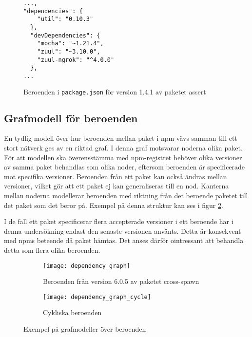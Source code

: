 \lstset{language=Java}
\begin{figure}[h]
  \center
  \begin{minipage}[c]{5cm}
    \begin{lstlisting}
...,
"dependencies": {
    "util": "0.10.3"
  },
  "devDependencies": {
    "mocha": "~1.21.4",
    "zuul": "~3.10.0",
    "zuul-ngrok": "^4.0.0"
  },
...
    \end{lstlisting}
  \end{minipage}
  \caption[Beroenden i \texttt{package.json} för version 1.4.1 av paketet assert]{Beroenden i \texttt{package.json} för version 1.4.1 av paketet assert \cite{npm-assert}}
  \label{fig:package.json}
\end{figure}

\subsection{Grafmodell för beroenden}
\label{subsec:joel_o-grafmodell}
En tydlig modell över hur beroenden mellan paket i npm vävs samman till ett stort nätverk ges av en riktad graf. I denna graf motsvarar noderna olika paket. För att modellen ska överensstämma med npm-registret behöver olika versioner av samma paket behandlas som olika noder, eftersom beroenden är specificerade mot specifika versioner. Beroenden från ett paket kan också ändras mellan versioner, vilket gör att ett paket ej kan generaliseras till en nod. Kanterna mellan noderna modellerar beroenden med riktning från det beroende paketet till det paket som det beror på. Exempel på denna struktur kan ses i figur \ref{fig:beroende-graf}.

I de fall ett paket specificerar flera accepterade versioner i ett beroende har i denna undersökning endast den senaste versionen använts. Detta är konsekvent med npms beteende då paket hämtas. Det anses därför ointressant att behandla detta som flera olika beroenden.

\begin{figure}
  \captionsetup{justification=centering}
  \centering
  \begin{subfigure}[t]{.5\textwidth}
    \begin{minipage}[t][8cm][b]{0,5\textwidth}
      \vspace*{\fill}
        \texttt{[image: dependency\_graph]}
      \vspace*{\fill}
    \end{minipage}
    \caption{Beroenden från version 6.0.5 av paketet cross-spawn}
    \label{fig:beroende-graf}
  \end{subfigure}%
  \begin{subfigure}[t]{.5\textwidth}
    \begin{minipage}[t][8cm][b]{0,5\textwidth}
      \vspace*{\fill}
      \texttt{[image: dependency\_graph\_cycle]}
      \vspace*{\fill}
    \end{minipage}
    \caption{Cykliska beroenden}
    \label{fig:beroende-graf-cykel}
  \end{subfigure}
  \caption{Exempel på grafmodeller över beroenden}
  \label{fig:grafmodell}
\end{figure}

